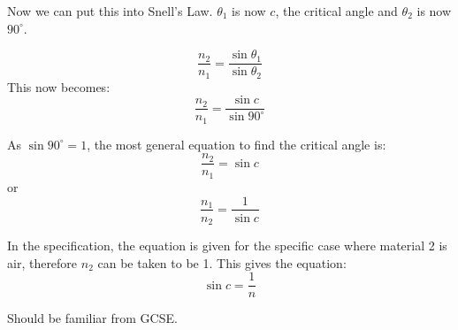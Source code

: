 \documentclass[revision-guide.tex]{subfiles}
\begin{document}
Now we can put this into Snell's Law. $\theta_1$ is now $c$, the critical angle and $\theta_2$ is now $90^{\circ}$.

$$\frac{n_2}{n_1} = \frac{\sin{\theta_1}}{\sin{\theta_2}}$$
This now becomes:
$$\frac{n_2}{n_1} = \frac{\sin{c}}{\sin{90^{\circ}}}$$

As $\sin{90^{\circ}} = 1$, the most general equation to find the critical angle is:
$$\frac{n_2}{n_1} = \sin{c}$$
or
$$\frac{n_1}{n_2} = \frac{1}{\sin{c}}$$

In the specification, the equation is given for the specific case where material 2 is air, therefore $n_2$ can be taken to be 1. This gives the equation:
$$\sin{c} = \frac{1}{n}$$


Should be familiar from GCSE.
\end{document}
